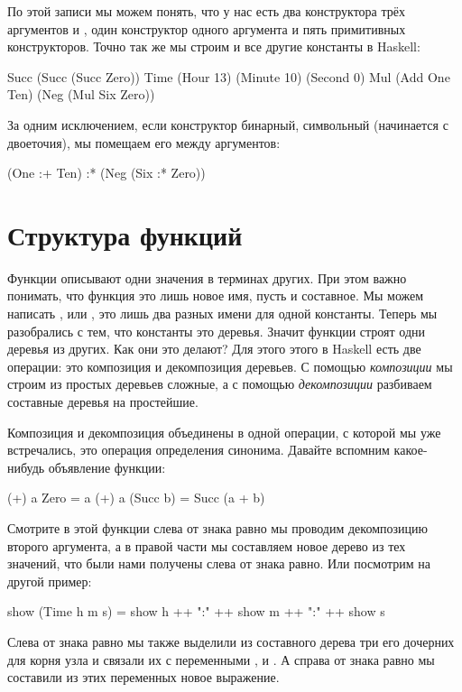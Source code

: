 По этой записи мы можем понять, что у нас есть два 
конструктора трёх аргументов  и , один конструктор
одного аргумента  и пять примитивных конструкторов. 
Точно так же мы строим и все другие константы в Haskell:

\begin{code}
Succ (Succ (Succ Zero))
Time (Hour 13) (Minute 10) (Second 0)
Mul (Add One Ten) (Neg (Mul Six Zero))
\end{code}

За одним исключением, если конструктор бинарный, символьный
(начинается с двоеточия), мы помещаем его между аргументов:

\begin{code}
(One :+ Ten) :* (Neg (Six :* Zero))
\end{code}


\section{Структура функций}

Функции описывают одни значения в терминах других. 
При этом важно понимать, что функция это лишь новое имя,
пусть и составное. Мы можем написать , или ,
это лишь два разных имени для одной константы. 
Теперь мы разобрались с тем, что константы это деревья.
Значит функции строят одни деревья из других. Как они это делают?
Для этого этого в Haskell есть две операции: это композиция
и декомпозиция деревьев. С помощью \emph{композиции} мы строим из
простых деревьев сложные, а с помощью \emph{декомпозиции} 
разбиваем составные деревья на простейшие.

Композиция и декомпозиция объединены в одной операции,
с которой мы уже встречались, это операция определения синонима.
Давайте вспомним какое-нибудь объявление функции:

\begin{code}
(+) a  Zero      = a
(+) a  (Succ b)  = Succ (a + b)
\end{code}

Смотрите в этой функции слева от знака равно мы проводим 
декомпозицию второго аргумента, а в правой части мы составляем
новое дерево из тех значений, что были нами получены слева
от знака равно. Или посмотрим на другой пример:

\begin{code}
show (Time h m s) = show h ++ ":" ++ show m ++ ":" ++ show s
\end{code}

Слева от знака равно мы также выделили из составного
дерева  три его дочерних для корня узла
и связали их с переменными ,  и . А справа
от знака равно мы составили из этих переменных новое выражение. 

